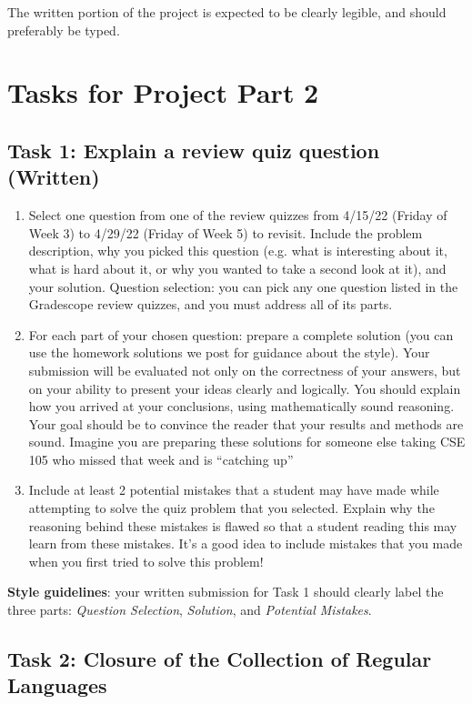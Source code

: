 \documentclass[12pt, oneside]{article}
\begin{document}
The written portion of the project is expected to be clearly legible, and should preferably be typed.

 \newpage
 \section{Tasks for Project Part 2}


 \subsection{Task 1: Explain a review quiz question (Written)}
	
	\begin{enumerate}
		\item Select one question from one of the review quizzes from 4/15/22 (Friday of Week 3) to 4/29/22  (Friday of Week 5) to revisit. Include the problem description, why you picked this question (e.g. what is interesting about it, what is hard about it, or why you wanted to take a second look at it), and your solution. Question selection: you can pick any one question listed in the Gradescope review quizzes, and you must address  all  of its parts. 
 		\item For each part of your chosen question: prepare a complete solution (you can use the homework solutions we post for guidance about the style). Your submission will be evaluated not only on the correctness of your answers, but on your ability to present your ideas clearly and logically. You should explain how you arrived at your conclusions, using mathematically sound reasoning. Your goal should be to convince the reader that your results and methods are sound. Imagine you are preparing these solutions for someone else taking CSE 105 who missed that week and is “catching up”
 
 		\item Include at least 2 potential mistakes that a student may have made while attempting to solve the quiz problem that you selected. Explain why the reasoning behind these mistakes is flawed so that a student reading this may learn from these mistakes. It’s a good idea to include mistakes that you made when you first tried to solve this problem!	
	\end{enumerate}
	
	{\bf Style guidelines}: your written submission for Task 1 should clearly label the three parts:
	{\it Question Selection}, {\it Solution},  and {\it Potential Mistakes}.

\newpage
\subsection{Task 2: Closure of the Collection of Regular Languages}
	
\end{document}
